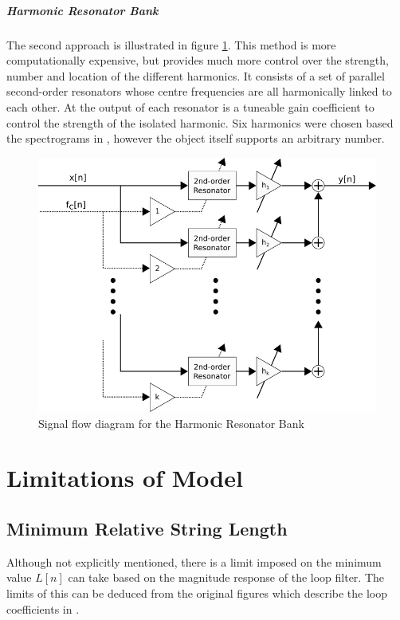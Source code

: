 \documentclass[../main.tex]{subfiles}
\begin{document}
\subparagraph{Harmonic Resonator Bank}
The second approach is illustrated in figure \ref{fig:HRB}. This method is more computationally expensive, but provides much more control over the strength, number and location of the different harmonics. It consists of a set of parallel second-order resonators whose centre frequencies are all harmonically linked to each other. At the output of each resonator is a tuneable gain coefficient to control the strength of the isolated harmonic. Six harmonics were chosen based the spectrograms in , however the object itself supports an arbitrary number.

\begin{figure}[h]
    \centering
    \includegraphics[scale=.5]{./images/diagrams/HarmonicResonatorBank.png}
    \caption{Signal flow diagram for the Harmonic Resonator Bank}
    \label{fig:HRB}
\end{figure}

\section{Limitations of Model}
\subsection{Minimum Relative String Length}
Although not explicitly mentioned, there is a limit imposed on the minimum value $L[n]$ can take based on the magnitude response of the loop filter. The limits of this can be deduced from the original figures which describe the loop coefficients in .
\end{document}
